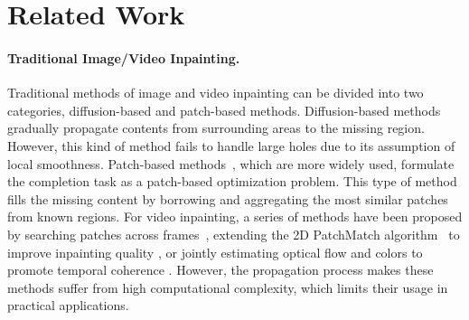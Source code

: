 \section{Related Work}
\paragraph{Traditional Image/Video Inpainting.}
Traditional methods of image and video inpainting can be divided into two categories, diffusion-based and patch-based methods. 
Diffusion-based methods \cite{bertalmio2000image,ballester2001filling} gradually propagate contents from surrounding areas to the missing region. 
However, this kind of method fails to handle large holes due to its assumption of local smoothness. 
%
Patch-based methods~\cite{bertalmio2003simultaneous,efros2001image}, which are more widely used, formulate the completion task as a patch-based optimization problem. 
This type of method fills the missing content by borrowing and aggregating the most similar patches from known regions. 
%
For video inpainting, a series of methods have been proposed by searching patches across frames~\cite{patwardhan2007video}, extending the 2D PatchMatch algorithm~\cite{barnes2009patchmatch} to improve inpainting quality \cite{newson2014video}, or jointly estimating optical flow and colors to promote temporal coherence \cite{huang2016temporally}. 
However, the propagation process makes these methods suffer from high computational complexity, which limits their usage in practical applications. 

